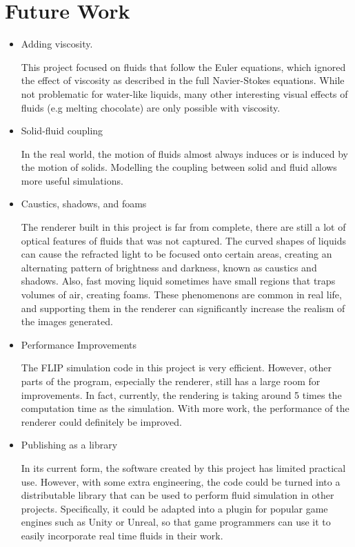 \section{Future Work}
\label{section future work}
\begin{itemize}
    \item Adding viscosity.
    
    This project focused on fluids that follow the Euler equations, which ignored the effect of viscosity as described in the full Navier-Stokes equations. While not problematic for water-like liquids, many other interesting visual effects of fluids (e.g melting chocolate) are only possible with viscosity. 
    

    \item Solid-fluid coupling
    
    In the real world, the motion of fluids almost always induces or is induced by the motion of solids. Modelling the coupling between solid and fluid allows more useful simulations. 

    \item Caustics, shadows, and foams
    
    The renderer built in this project is far from complete, there are still a lot of optical features of fluids that was not captured. The curved shapes of liquids can cause the refracted light to be focused onto certain areas, creating an alternating pattern of brightness and darkness, known as caustics and shadows. Also, fast moving liquid sometimes have small regions that traps volumes of air, creating foams. These phenomenons are common in real life, and supporting them in the renderer can significantly increase the realism of the images generated.

    \item Performance Improvements
    
    The FLIP simulation code in this project is very efficient. However, other parts of the program, especially the renderer, still has a large room for improvements. In fact, currently, the rendering is taking around 5 times the computation time as the simulation. With more work, the performance of the renderer could definitely be improved.


    \item Publishing as a library
    
    In its current form, the software created by this project has limited practical use. However, with some extra engineering, the code could be turned into a distributable library that can be used to perform fluid simulation in other projects. Specifically, it could be adapted into a plugin for popular game engines such as Unity or Unreal, so that game programmers can use it to easily incorporate real time fluids in their work. 
    
\end{itemize}

